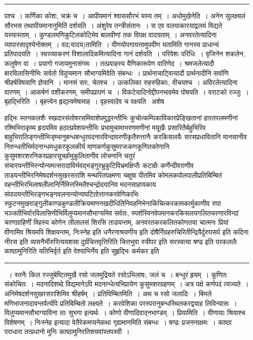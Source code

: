 \documentclass[11pt, openany]{book}
\begin{document}
\vspace{2mm}
\hrule

\noindent
{\s पश्च~। कर्णिका कोशः, चक्रं च~। आपीयमानं श्वाससौरभं यस्य तम्~। {\qtt अधोमुखेनेति}~। अनेन सुलक्ष्यलं सौरभस तथापीयमानानुमितिं दर्शयति~। अंशुरेव तन्त्रीसंतानः~। स एव वलयाकारयाद्वलयं विद्यते यस्यास्ताम्~। कुण्डलमणिकुटिलकोटिमेव बालवीणां तक विपक्ष वादयताम्~। अनवरतेत्यादिना व्यापारसादृश्येनोक्तम्~। {\qtt वद(वादय)तामिति}~। वीणयोपगायत्तामुपवीण यतामिति गानस्य प्राधान्यं प्रतिपादयति~। स्वरव्याकरणं विशालादिकमित्यादिना गानं दर्शयति~। परिवेशः परिधिः~। वृजिनेन शकलेन, कलुषेण वा~। प्रयागो गजायमुनासंगमः~। तत्प्रवाहस्य वैणिकारूपेण वारिणेद~। श्रमजलेत्यादौ बारविलासिनीभिः सर्वतो विदुप्यमान सौभाग्यमिवेति संबन्धः~। प्रार्थनाचाट्वित्यादौ प्रार्थनादीनि सर्वाणि श्रीहर्षविषयाणि ज्ञेयानि~। मानसं सरः, चेतश्च~। उत्कलिका रुहरुहिकाः, वीचयश्च~। अविरलेत्यादिना वारणम्~। आकर्षणं वशीकरणम्, समीपप्रापणं च~। विकटेयादिनोद्दीपनभावमेव पोषयति~। वराटको रज्जुः~। {\qtt बृहद्भिरिति}~। बृहत्त्वेन हृद्यत्वमेषामाह~। वृहस्वादेव च वक्ष्यति \textendash\ {\qtt अशेष}\textendash}

\newpage

\noindent
हद्भिः स्तनकलशैः स्खदारसंतोषरसमिवाशेपमुद्धरन्तीभिः कुचोत्कम्पिकाविकारप्रेङ्खितानां हारतरलमणीनां रश्मिभिराकृष्य हृदयमिव हठात्प्रवेशयन्तीभिः प्रभामुचामाभरणमणीनां मयूखैः प्रसारितैर्बहुभिरिव बाहुभिरालिङ्गन्तीभिजृम्भानुबन्धबन्धुरवदनारविन्दावरणीकृतैरुत्तानैः करकिसलयैः सरसप्रधावितानि मानसानीव निरुन्धतीभिर्मदनान्धमधुकरकुलकीर्य माणकर्णकुसुमरजःकणकूणितकोणानि कुसुमशरशरनिकरप्रहारसूर्च्छामुकुलितानीव लोचनानि चतुरं संचारयन्तीभिरन्योन्यमत्सरादाविर्भवद्भङ्गुरभ्रुकुटिविभ्रमक्षिप्तैः कटाक्षैः कर्णेन्दीवराणीव ताडयन्तीभिरनिमेषदर्शनसुखरसराशि मन्थरितपक्ष्मणा चक्षुषा पीतमिव कोमलकपोलपालीप्रतिबिम्बितं वहन्तीभिरभिलाषलीलानिर्निमित्तस्मितैश्चन्द्रोदयानिव मदनसाहायकाय संपादयन्तीभिरङ्गभङ्गवलनान्योन्यघटितोत्तानकरवेणिकाभिः स्फुटनमुखराङ्गुलीकाण्डकुण्डलीक्रियमाणनखदीधितिनिवहनिभेनाकिंचित्करकामकार्मुकाणीव रुपा भञ्जतीभिर्वारविलासिनीभिर्विलुप्यमानसौभाग्यमिव सर्वतः, स्पर्शस्विनवेपमानकरकिसलयगलितचरणारविन्दां चरणग्राहिणीं विहस्य कोणेन लीलालसं शिरसि ताडयन्तम्, अनवरतकरकलितकोणतया चात्मनः प्रियां वीणामिव श्रियमपि शिक्षयन्तम्, निःस्नेह इति धनैरनाश्रयणीय इति दोषैर्निग्रहरुचिरितीन्द्रियैर्दुरुपसर्प इति कदिना नीरस इति व्यसनैर्भीरुरित्ययशसा दुर्ग्रचित्तवृत्तिरिति चित्तभुवा स्त्रीपर इति सरस्वत्या षण्ढ इति परकललैः काष्ठामुनिरिति यतिभिर्वृर्त इति वेश्याभिर्नेय इति सुहृद्भिः कर्मकर इति

\vspace{2mm}
\hrule

\noindent
{~। स्तनैः किल रज्जुबेष्टितमुखै रसो जलमुद्रियते रसोऽभिलाषः, जलं च~। बन्धुरं हृयम्~। कूणितः संकोचितः~। मदनादिशब्दे विद्यमानेऽपि मदनान्धेत्यभिप्रायेण कुसुमशरग्रहणम्~। अत्र पक्षे कर्णपदं त्यज्यते~। अनिमेषदर्शनसुखरसराशिमिव श्रीहर्षम्~। {\qtt प्रतिविम्बितमिति}~। अथ च रसो जलादिः~। बिमले मणिभाजनादावन्तर्वर्त्यपि प्रतिबिम्बितो लक्ष्यते~। करवेशिका परस्परानुबन्धस्थितकरद्वयाह लिविन्यासः~। विलुप्यमानसौभाग्याविना ताः सुभगा इत्यर्थः~। कोणो वीणादिवाद्नभाण्डम्~। {\qtt प्रियामिति}~। वीणायाः श्रियाश्च विशेषणम्~। निःस्नेह इत्यादा वेतैरेकमप्यनेकथा गृह्यमाणमिति संबन्धः~। षण्ढः प्रजननाक्षमः~। काष्ठा पराधारा तत्प्रधानो मुनिः काष्ठामुनिरतिशयवांस्तपस्वी~।}
\end{document}
